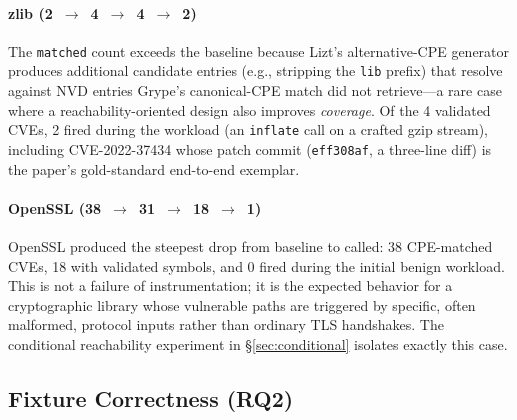 \documentclass[conference]{IEEEtran}
\begin{document}
\paragraph{zlib (2~$\to$~4~$\to$~4~$\to$~2)}
The \texttt{matched} count exceeds the baseline because Lizt's alternative-CPE generator produces additional candidate entries (e.g., stripping the \texttt{lib} prefix) that resolve against NVD entries Grype's canonical-CPE match did not retrieve---a rare case where a reachability-oriented design also improves \emph{coverage}. Of the 4 validated CVEs, 2 fired during the workload (an \texttt{inflate} call on a crafted gzip stream), including CVE-2022-37434 whose patch commit (\texttt{eff308af}, a three-line diff) is the paper's gold-standard end-to-end exemplar.

\paragraph{OpenSSL (38~$\to$~31~$\to$~18~$\to$~1)}
OpenSSL produced the steepest drop from baseline to called: 38 CPE-matched CVEs, 18 with validated symbols, and 0 fired during the initial benign workload. This is not a failure of instrumentation; it is the expected behavior for a cryptographic library whose vulnerable paths are triggered by specific, often malformed, protocol inputs rather than ordinary TLS handshakes. The conditional reachability experiment in \S\ref{sec:conditional} isolates exactly this case.

\subsection{Fixture Correctness (RQ2)}
\end{document}
